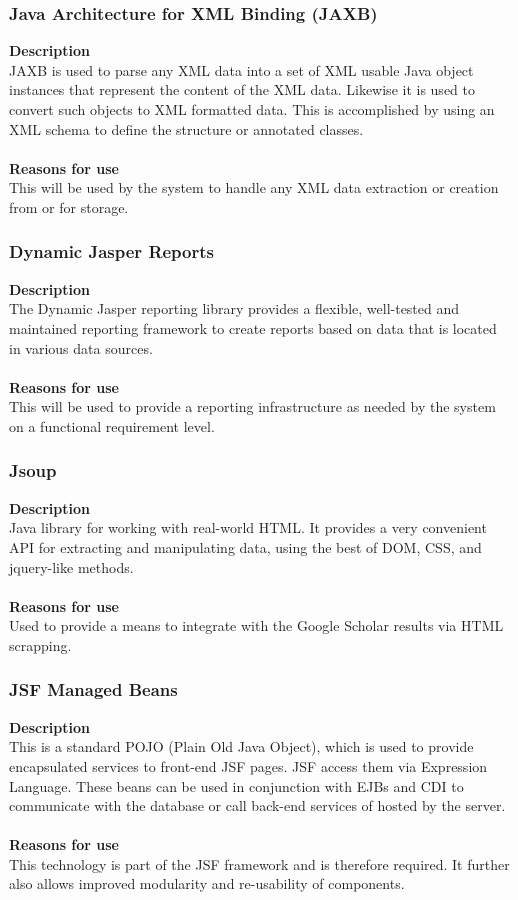 \documentclass[12pt]{article}
\begin{document}
\subsubsection{Java Architecture for XML Binding (JAXB)}
\textbf{Description}\\
JAXB is used to parse any XML data into a set of XML usable Java object instances that represent the content of the XML data. Likewise it is used to convert such objects to XML formatted data. This is accomplished by using an XML schema to define the structure or annotated classes.\\\\
\textbf{Reasons for use}\\
This will be used by the system to handle any XML data extraction or creation from or for storage.

\subsubsection{Dynamic Jasper Reports}
\textbf{Description}\\
The Dynamic Jasper reporting library provides a flexible, well-tested and maintained reporting framework to create reports based on data that is located in various data sources.\\\\
\textbf{Reasons for use}\\
This will be used to provide a reporting infrastructure as needed by the system on a functional requirement level.   

\subsubsection{Jsoup}
\textbf{Description}\\
Java library for working with real-world HTML. It provides a very convenient API for extracting and manipulating data, using the best of DOM, CSS, and jquery-like methods.\\\\
\textbf{Reasons for use}\\
Used to provide a means to integrate with the Google Scholar results via HTML scrapping.  

\subsubsection{JSF Managed Beans}
\textbf{Description}\\
This is a standard POJO (Plain Old Java Object), which is used to provide encapsulated services to  front-end JSF pages. JSF access them via Expression Language. These beans can be used in conjunction with EJBs and CDI to communicate with the database or call back-end services of hosted by the server.\\\\
\textbf{Reasons for use}\\
This technology is part of the JSF framework and is therefore required. It further also allows improved modularity and re-usability of components.
\end{document}
